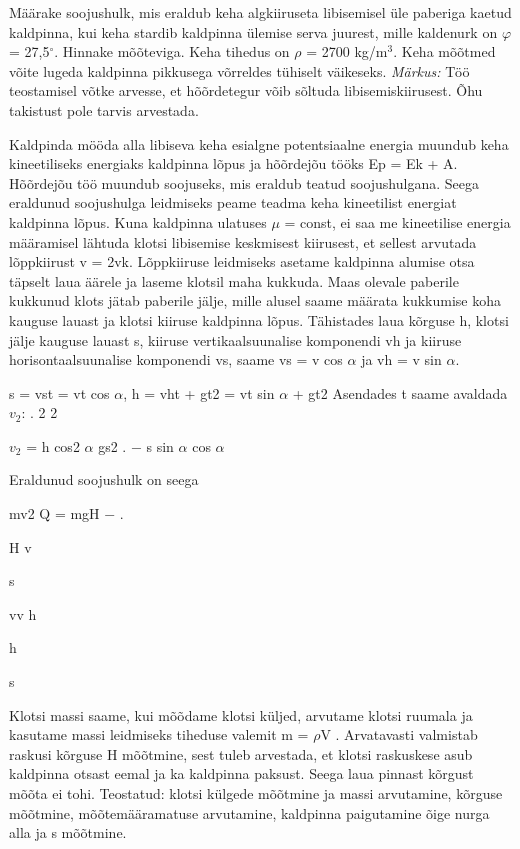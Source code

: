 
Määrake soojushulk, mis eraldub keha algkiiruseta libisemisel üle paberiga kaetud kaldpinna, kui keha stardib kaldpinna ülemise serva juurest, mille kaldenurk on $\varphi$ = 27,5$^\circ$. Hinnake mõõteviga. Keha tihedus on $\rho$ = 2700 kg/m$^3$. Keha mõõtmed võite lugeda kaldpinna pikkusega võrreldes tühiselt väikeseks.
\textit{Märkus:} Töö teostamisel võtke arvesse, et hõõrdetegur võib sõltuda libisemiskiirusest. Õhu takistust pole tarvis arvestada.

\hint

\solu
Kaldpinda mööda alla libiseva keha esialgne potentsiaalne energia muundub keha kineetiliseks energiaks kaldpinna lõpus ja hõõrdejõu tööks Ep = Ek + A. Hõõrdejõu töö muundub soojuseks, mis eraldub teatud soojushulgana. Seega eraldunud soojushulga leidmiseks peame teadma keha kineetilist energiat kaldpinna lõpus. Kuna kaldpinna ulatuses $\mu$ = const, ei saa me kineetilise energia määramisel lähtuda klotsi libisemise keskmisest kiirusest, et sellest arvutada lõppkiirust v = 2vk. Lõppkiiruse leidmiseks asetame kaldpinna alumise otsa täpselt laua äärele ja laseme klotsil maha kukkuda. Maas olevale paberile kukkunud klots jätab paberile jälje, mille alusel saame määrata kukkumise koha kauguse lauast ja klotsi kiiruse kaldpinna lõpus. Tähistades laua kõrguse h, klotsi jälje kauguse lauast s, kiiruse vertikaalsuunalise komponendi vh ja kiiruse horisontaalsuunalise komponendi vs, saame vs = v cos $\alpha$ ja vh = v sin $\alpha$.

s = vst = vt cos $\alpha$, h = vht + gt2 = vt sin $\alpha$ + gt2 Asendades t saame avaldada $v_2$: . 2 2

$v_2$ = h cos2 $\alpha$ gs2 . $-$ s sin $\alpha$ cos $\alpha$

Eraldunud soojushulk on seega

mv2 Q = mgH $-$ .

H v

s

vv h

h

s

Klotsi massi saame, kui mõõdame klotsi küljed, arvutame klotsi ruumala ja kasutame massi leidmiseks tiheduse valemit m = $\rho$V . Arvatavasti valmistab raskusi kõrguse H mõõtmine, sest tuleb arvestada, et klotsi raskuskese asub kaldpinna otsast eemal ja ka kaldpinna paksust. Seega laua pinnast kõrgust mõõta ei tohi. Teostatud: klotsi külgede mõõtmine ja massi arvutamine, kõrguse mõõtmine, mõõtemääramatuse arvutamine, kaldpinna paigutamine õige nurga alla ja s mõõtmine.
\probend
